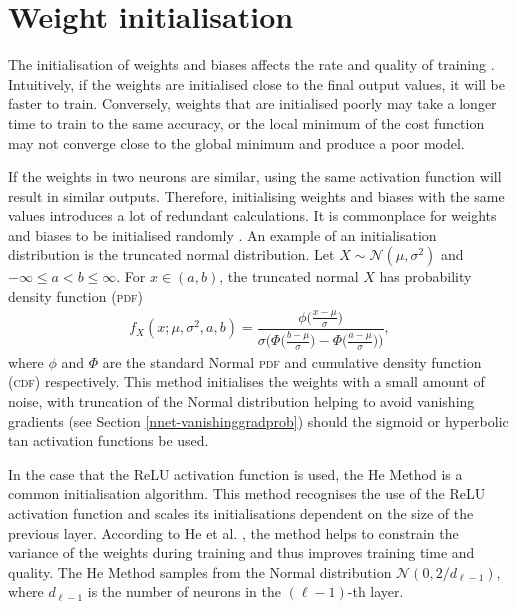 
\section{Weight initialisation}

The initialisation of weights and biases affects the rate and quality of training \cite{Mishkin2016}. Intuitively, if the weights are initialised close to the final output values, it will be faster to train. Conversely, weights that are initialised poorly may take a longer time to train to the same accuracy, or the local minimum of the cost function may not converge close to the global minimum and produce a poor model.

If the weights in two neurons are similar, using the same activation function will result in similar outputs. Therefore, initialising weights and biases with the same values introduces a lot of redundant calculations. It is commonplace for weights and biases to be initialised randomly \cite{Nielson2015}. An example of an initialisation distribution is the truncated normal distribution. Let $X\sim\mathcal{N}(\mu,\sigma^2)$ and $-\infty \le a < b \le \infty$. For $x \in (a,b)$, the truncated normal $X$ has probability density function (\textsc{pdf})
\begin{align}
	f_X(x;\mu, \sigma^2,a,b) = \dfrac{\phi\big(\frac{x-\mu}{\sigma}\big)}{\sigma\bigg(\Phi\big(\frac{b-\mu}{\sigma}\big) - \Phi\big(\frac{a-\mu}{\sigma}\big)\bigg)},
\end{align}
where $\phi$ and $\Phi$ are the standard Normal \textsc{pdf} and cumulative density function (\textsc{cdf}) respectively. This method initialises the weights with a small amount of noise, with truncation of the Normal distribution helping to avoid vanishing gradients (see Section \ref{nnet-vanishinggradprob}) should the sigmoid or hyperbolic tan activation functions be used.

In the case that the ReLU activation function is used, the He Method \cite{HeKaiming2015DDiR} is a common initialisation algorithm. This method recognises the use of the ReLU activation function and scales its initialisations dependent on the size of the previous layer. According to He et al. \cite{HeKaiming2015DDiR}, the method helps to constrain the variance of the weights during training and thus improves training time and quality. The He Method samples from the Normal distribution $\mathcal{N}\left(0, 2/d_{\ell-1}\right)$, where $d_{\ell-1}$ is the number of neurons in the $(\ell-1)$-th layer.

